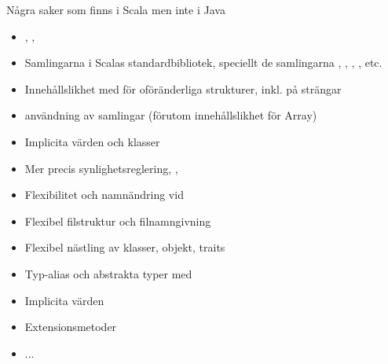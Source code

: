 \begin{Slide}{Några saker som finns i Scala men inte i Java}
\begin{multicols}{2}
\begin{itemize}
\item {}, , 

\item Samlingarna i Scalas standardbibliotek, speciellt de  samlingarna , , , , etc.

\item Innehållslikhet med \code{==} för oföränderliga strukturer, inkl. \code{< <= > >= } på strängar

\item {} användning av samlingar  (förutom innehållslikhet för Array)

\item Implicita värden och klasser

\item Mer precis synlighetsreglering, , 

\item Flexibilitet och namnändring vid 

\item Flexibel filstruktur och filnamngivning

\item Flexibel nästling av klasser, objekt, traits

\item Typ-alias och abstrakta typer med 

\item Implicita värden 

\item Extensionsmetoder 

\item ...
\end{itemize}
\ifkompendium\else
\end{multicols}
\fi
\end{Slide}


